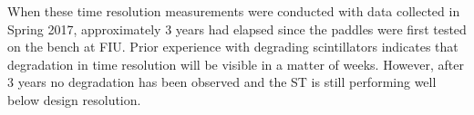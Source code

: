 When these time resolution measurements were conducted with data collected in Spring 2017, approximately 3 years had elapsed since the paddles were first tested on the bench at FIU.  Prior experience with degrading scintillators indicates that degradation in time resolution will be visible in a matter of weeks.  However, after 3 years no degradation has been observed and the ST is still performing well below design resolution.
